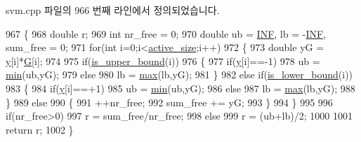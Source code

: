 svm.\+cpp 파일의 966 번째 라인에서 정의되었습니다.


\begin{DoxyCode}
967 \{
968     \textcolor{keywordtype}{double} r;
969     \textcolor{keywordtype}{int} nr\_free = 0;
970     \textcolor{keywordtype}{double} ub = \hyperlink{svm_8cpp_a12c2040f25d8e3a7b9e1c2024c618cb6}{INF}, lb = -\hyperlink{svm_8cpp_a12c2040f25d8e3a7b9e1c2024c618cb6}{INF}, sum\_free = 0;
971     \textcolor{keywordflow}{for}(\textcolor{keywordtype}{int} i=0;i<\hyperlink{class_solver_a06ba1b87b3749cc545e573151b7beca0}{active\_size};i++)
972     \{
973         \textcolor{keywordtype}{double} yG = \hyperlink{class_solver_a3acc1043d06dedf87f054ff3eea5c426}{y}[i]*\hyperlink{class_solver_ad8ab27068f2e045591970aae1201afe9}{G}[i];
974 
975         \textcolor{keywordflow}{if}(\hyperlink{class_solver_a98d878b13d6f710fcaa0b16e657a37b6}{is\_upper\_bound}(i))
976         \{
977             \textcolor{keywordflow}{if}(\hyperlink{class_solver_a3acc1043d06dedf87f054ff3eea5c426}{y}[i]==-1)
978                 ub = \hyperlink{svm_8cpp_a348440c5435269ac7c60d2e2d8916f48}{min}(ub,yG);
979             \textcolor{keywordflow}{else}
980                 lb = \hyperlink{svm_8cpp_a7cba98555a7346b01e4cc06205527d8a}{max}(lb,yG);
981         \}
982         \textcolor{keywordflow}{else} \textcolor{keywordflow}{if}(\hyperlink{class_solver_a5876eedb0a6de6954f6037af0992cbed}{is\_lower\_bound}(i))
983         \{
984             \textcolor{keywordflow}{if}(\hyperlink{class_solver_a3acc1043d06dedf87f054ff3eea5c426}{y}[i]==+1)
985                 ub = \hyperlink{svm_8cpp_a348440c5435269ac7c60d2e2d8916f48}{min}(ub,yG);
986             \textcolor{keywordflow}{else}
987                 lb = \hyperlink{svm_8cpp_a7cba98555a7346b01e4cc06205527d8a}{max}(lb,yG);
988         \}
989         \textcolor{keywordflow}{else}
990         \{
991             ++nr\_free;
992             sum\_free += yG;
993         \}
994     \}
995 
996     \textcolor{keywordflow}{if}(nr\_free>0)
997         r = sum\_free/nr\_free;
998     \textcolor{keywordflow}{else}
999         r = (ub+lb)/2;
1000 
1001     \textcolor{keywordflow}{return} r;
1002 \}
\end{DoxyCode}


